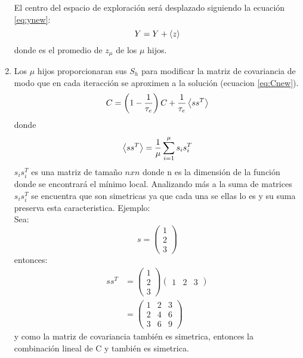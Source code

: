\begin{enumerate}
          El centro del espacio de exploración será desplazado siguiendo la ecuación \ref{eq:ynew}:
          \begin{equation}
              Y=Y+\left\langle z \right\rangle
              \label{eq:ynew}
          \end{equation}
          donde  es el promedio de $z_\mu$ de los $\mu$ hijos.
    \item Los $\mu$ hijos proporcionaran sus $S_h$ para modificar la matriz de covariancia de modo que en cada iteracción se aproximen a la solución (ecuacion \ref{eq:Cnew}).
          \begin{equation}
              C= \left(1-\frac{1}{\tau_e} \right) C + \frac{1}{\tau_e} \left\langle ss^T \right\rangle
              \label{eq:Cnew}
          \end{equation}
          donde
          \begin{equation*}
              \left\langle ss^T \right\rangle =\frac{1}{\mu} \sum_{i=1}^\mu s_is_i^T
          \end{equation*}
          $s_is_i^T$ es una matriz de tamaño $nxn$ donde n es la dimensión de la función donde se encontrará el mínimo local. Analizando más a la suma de matrices $s_is_i^T$ se encuentra que son simetricas ya que cada una se ellas lo es y su suma preserva esta caracteristica. Ejemplo:\\
          Sea:
          \begin{equation*}
              s=\begin{pmatrix}
                  1 \\ 2 \\ 3
              \end{pmatrix}
          \end{equation*}
          entonces:
          \begin{align*}
              ss^T & = \begin{pmatrix}
                  1 \\ 2 \\ 3
              \end{pmatrix}\begin{pmatrix}
                  1 & 2 & 3
              \end{pmatrix} \\
                   & = \begin{pmatrix}
                  1 & 2 & 3 \\
                  2 & 4 & 6 \\
                  3 & 6 & 9
              \end{pmatrix}
          \end{align*}
          y como la matriz de covariancia también es simetrica, entonces la combinación lineal de C y  también es simetrica.
\end{enumerate}